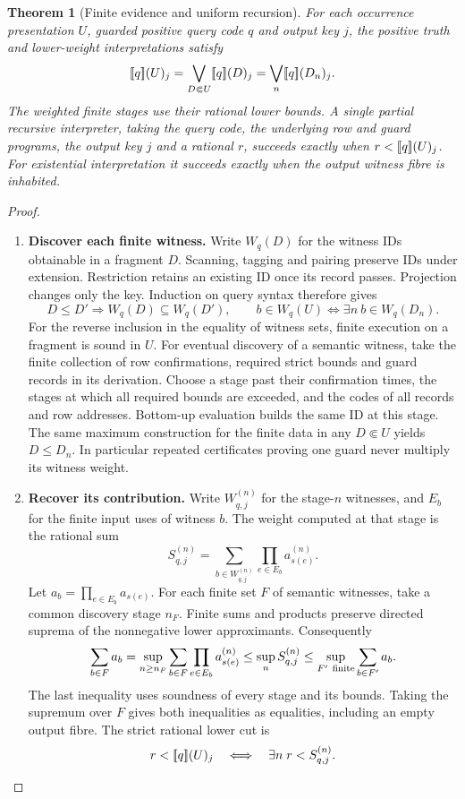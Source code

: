 \documentclass[11pt,a4paper]{article}
\newtheorem{theorem}{Theorem}[section]
\theoremstyle{definition}
\theoremstyle{remark}\newaliascnt{remark}{theorem}
\providecommand{\llbracket}{\mathopen{[\mkern-3mu[}}
\providecommand{\rrbracket}{\mathclose{]\mkern-3mu]}}
\numberwithin{equation}{section}
\begin{document}
\begin{theorem}[Finite evidence and uniform recursion]\label{thm:evidence}
For each occurrence presentation $U$, guarded positive query code $q$ and output key $j$, the positive truth and lower-weight interpretations satisfy
\[
 \llbracket q\rrbracket(U)_j
    =\bigvee_{D\Subset U}\llbracket q\rrbracket(D)_j
    =\bigvee_n\llbracket q\rrbracket(D_n)_j .
\]
The weighted finite stages use their rational lower bounds. A single partial recursive interpreter, taking the query code, the underlying row and guard programs, the output key $j$ and a rational $r$, succeeds exactly when $r<\llbracket q\rrbracket(U)_j$. For existential interpretation it succeeds exactly when the output witness fibre is inhabited.
\end{theorem}
\begin{proof}\leavevmode
\begin{enumerate}[titledsteps]
    \item \textbf{Discover each finite witness.} Write \(W_q(D)\) for the witness IDs obtainable in a fragment \(D\). Scanning, tagging and pairing preserve IDs under extension. Restriction retains an existing ID once its record passes. Projection changes only the key. Induction on query syntax therefore gives
\[
 D\le D'\Longrightarrow W_q(D)\subseteq W_q(D'),\qquad
 b\in W_q(U)\Longleftrightarrow \exists n\ b\in W_q(D_n).
\]
For the reverse inclusion in the equality of witness sets, finite execution on a fragment is sound in \(U\). For eventual discovery of a semantic witness, take the finite collection of row confirmations, required strict bounds and guard records in its derivation. Choose a stage past their confirmation times, the stages at which all required bounds are exceeded, and the codes of all records and row addresses. Bottom-up evaluation builds the same ID at this stage. The same maximum construction for the finite data in any \(D\Subset U\) yields \(D\le D_n\). In particular repeated certificates proving one guard never multiply its witness weight.


    \item \textbf{Recover its contribution.} Write $W_{q,j}^{(n)}$ for the stage-$n$ witnesses, and $E_b$ for the finite input uses of witness $b$. The weight computed at that stage is the rational sum
\[
 S_{q,j}^{(n)}=\sum_{b\in W_{q,j}^{(n)}}
                      \prod_{e\in E_b}a_{s(e)}^{(n)}.
\]
Let \(a_b=\prod_{e\in E_b}a_{s(e)}\). For each finite set \(F\) of semantic witnesses, take a common discovery stage \(n_F\). Finite sums and products preserve directed suprema of the nonnegative lower approximants. Consequently
\[
 \sum_{b\in F}a_b
  =\sup_{n\ge n_F}\sum_{b\in F}\prod_{e\in E_b}a_{s(e)}^{(n)}
  \le\sup_n S^{(n)}_{q,j}
  \le\sup_{F'\ {\rm finite}}\sum_{b\in F'}a_b .
\]
The last inequality uses soundness of every stage and its bounds. Taking the supremum over \(F\) gives both inequalities as equalities, including an empty output fibre. The strict rational lower cut is
\[
 r<\llbracket q\rrbracket(U)_j\quad\Longleftrightarrow\quad
 \exists n\;r<S_{q,j}^{(n)}.
\]


\end{enumerate}
\end{proof}
\end{document}
